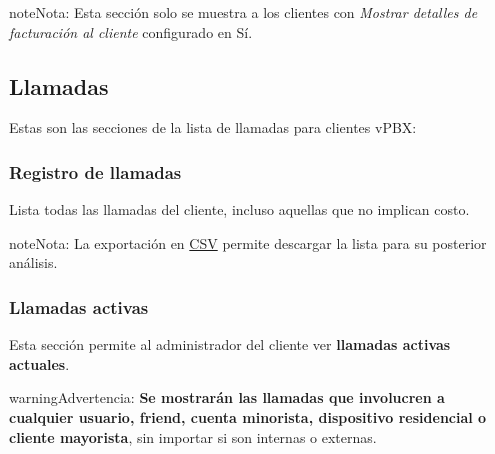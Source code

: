 \documentclass[letterpaper,10pt,spanish]{sphinxmanual}
\begin{document}
\begin{notice}{note}{Nota:}
Esta sección solo se muestra a los clientes con \emph{Mostrar detalles de facturación al cliente} configurado en Sí.
\end{notice}


\subsection{Llamadas}
\label{administration_portal/client/vpbx/calls/index::doc}\label{administration_portal/client/vpbx/calls/index:calls}
Estas son las secciones de la lista de llamadas para clientes vPBX:


\subsubsection{Registro de llamadas}
\label{administration_portal/client/vpbx/calls/call_registry::doc}\label{administration_portal/client/vpbx/calls/call_registry:call-registry}\label{administration_portal/client/vpbx/calls/call_registry:id1}
Lista todas las llamadas del cliente, incluso aquellas que no implican costo.

\begin{notice}{note}{Nota:}
La exportación en \href{https://es.wikipedia.org/wiki/CSV}{CSV} permite descargar la lista para su posterior análisis.
\end{notice}


\subsubsection{Llamadas activas}
\label{administration_portal/client/vpbx/calls/active_calls::doc}\label{administration_portal/client/vpbx/calls/active_calls:active-calls}
Esta sección permite al administrador del cliente ver \textbf{llamadas activas actuales}.

\begin{notice}{warning}{Advertencia:}
\textbf{Se mostrarán las llamadas que involucren a cualquier usuario, friend, cuenta minorista, dispositivo residencial o cliente mayorista}, sin importar si son internas o externas.
\end{notice}
\end{document}
